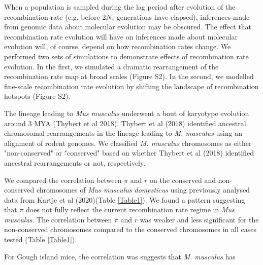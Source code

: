 \documentclass[10pt,twoside, twocolumn]{GSA_format}
\begin{document}
When a population is sampled during the lag period after evolution of the recombination rate (e.g. before $2N_e$ generations have elapsed), inferences made from genomic data about molecular evolution may be obscured. The  effect that recombination rate evolution will have on inferences made about molecular evolution will, of course, depend on how recombination rates change. We performed two sets of simulations to demonstrate effects of recombination rate evolution. In the first, we simulated a dramatic rearrangement of the recombination rate map at broad scales (Figure S2). In the second, we modelled fine-scale recombination rate evolution by shifting the landscape of recombination hotspots (Figure S2). 




The lineage leading to \textit{Mus musculus} underwent a bout of karyotype evolution around 3 MYA (Thybert et al 2018). Thybert et al (2018) identified ancestral chromosomal rearrangements in the lineage leading to \textit{M. musculus} using an alignment of rodent genomes. We classified \textit{M. musculus} chromosomes as either "non-conserved" or "conserved" based on whether Thybert et al (2018) identified ancestral rearrangements or not, respectively.

\vspace{5px}

We compared the correlation between $\pi$ and $r$ on the conserved and non-conserved chromosomes of \textit{Mus musculus domesticus} using previously analysed data from Kartje et al (2020)(Table \ref{Table1}). We found a pattern suggesting that $\pi$ does not fully reflect the current recombination rate regime in \textit{Mus musculus}. The correlation between $\pi$ and $r$ was weaker and less significant for the non-conserved chromosomes compared to the conserved chromosomes in all cases tested (Table \ref{Table1}). 

For Gough island mice, the correlation was  
suggests that \textit{M. musculus} has 
\end{document}
